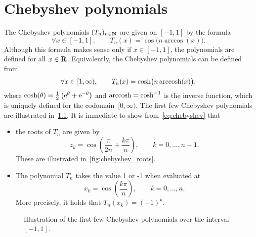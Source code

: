 \chapter{Chebyshev polynomials}%
\label{cha:Chebyshev polynomials}

The Chebyshev polynomials $(T_n)_{n \in \mathbf N}$ are given on $[-1, 1]$ by the formula
\begin{equation}
    \label{eq:chebyshev}
    \forall x \in [-1, 1], \qquad
    T_n(x) = \cos \bigl(n \arccos(x)\bigr).
\end{equation}
Although this formula makes sense only if $x \in [-1, 1]$,
the polynomials are defined for all $x \in \mathbf R$.
Equivalently,
the Chebyshev polynomials can be defined from
\begin{equation}
    \label{eq:chebyshev_cosh}
    \forall x \in [1, \infty), \qquad
    T_n(x) = \cosh \bigl(n \operatorname{arccosh}(x)\bigr).
\end{equation}
where $\cosh(\theta) = \frac{1}{2} \left( \mathrm e^\theta + \mathrm e^{-\theta} \right)$
and $\operatorname{arccosh} = \cosh^{-1}$ is the inverse function,
which is uniquely defined for the codomain~$[0, \infty)$.
The first few Chebyshev polynomials are illustrated in~\cref{fig:chebyshev}.
It is immediate to show from~\eqref{eq:chebyshev} that
\begin{itemize}
    \item
        the roots of $T_n$ are given by
        \[
            z_k = \cos \left( \frac{\pi}{2n} + \frac{k\pi}{n} \right), \qquad k = 0, \dotsc, n-1.
        \]
        These are illustrated in~\cref{fig:chebyshev_roots}.

    \item
        The polynomial $T_n$ takes the value 1 or -1 when evaluated at
        \begin{equation}
            \label{eq:chebyshev_maxima}
            x_k = \cos \left( \frac{k \pi}{n} \right), \qquad k = 0, \dotsc, n.
        \end{equation}
        More precisely, it holds that $T_n(x_k) = (-1)^k$.
\end{itemize}


\begin{figure}
    \centering
    \caption{Illustration of the first few Chebyshev polynomials over the interval $[-1, 1]$.}
    \label{fig:chebyshev}
\end{figure}

